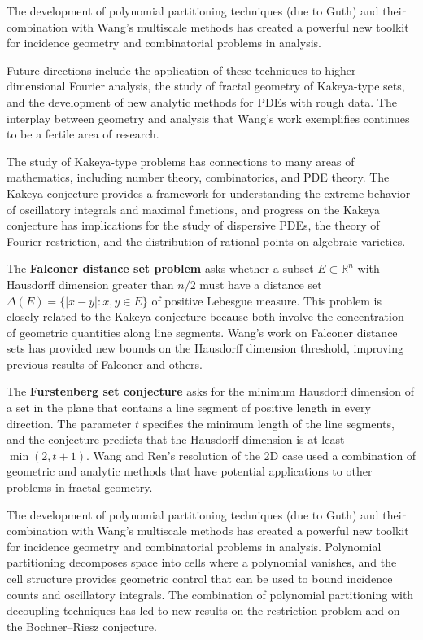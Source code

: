 The development of polynomial partitioning techniques (due to Guth) and their combination with Wang's multiscale methods has created a powerful new toolkit for incidence geometry and combinatorial problems in analysis.

Future directions include the application of these techniques to higher-dimensional Fourier analysis, the study of fractal geometry of Kakeya-type sets, and the development of new analytic methods for PDEs with rough data. The interplay between geometry and analysis that Wang's work exemplifies continues to be a fertile area of research.

The study of Kakeya-type problems has connections to many areas of mathematics, including number theory, combinatorics, and PDE theory. The Kakeya conjecture provides a framework for understanding the extreme behavior of oscillatory integrals and maximal functions, and progress on the Kakeya conjecture has implications for the study of dispersive PDEs, the theory of Fourier restriction, and the distribution of rational points on algebraic varieties.

The \textbf{Falconer distance set problem} asks whether a subset $E \subset \mathbb{R}^n$ with Hausdorff dimension greater than $n/2$ must have a distance set $\Delta(E) = \{|x-y| : x, y \in E\}$ of positive Lebesgue measure. This problem is closely related to the Kakeya conjecture because both involve the concentration of geometric quantities along line segments. Wang's work on Falconer distance sets has provided new bounds on the Hausdorff dimension threshold, improving previous results of Falconer and others.

The \textbf{Furstenberg set conjecture} asks for the minimum Hausdorff dimension of a set in the plane that contains a line segment of positive length in every direction. The parameter $t$ specifies the minimum length of the line segments, and the conjecture predicts that the Hausdorff dimension is at least $\min(2, t+1)$. Wang and Ren's resolution of the 2D case used a combination of geometric and analytic methods that have potential applications to other problems in fractal geometry.

The development of polynomial partitioning techniques (due to Guth) and their combination with Wang's multiscale methods has created a powerful new toolkit for incidence geometry and combinatorial problems in analysis. Polynomial partitioning decomposes space into cells where a polynomial vanishes, and the cell structure provides geometric control that can be used to bound incidence counts and oscillatory integrals. The combination of polynomial partitioning with decoupling techniques has led to new results on the restriction problem and on the Bochner--Riesz conjecture.

